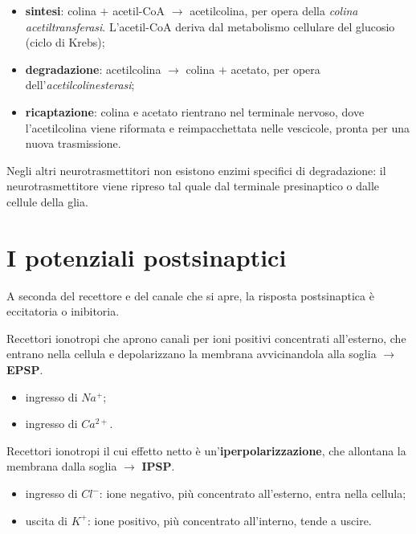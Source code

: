 \begin{itemize}
  \item \textbf{sintesi}: colina $+$ acetil-CoA $\rightarrow$ acetilcolina, per opera della
    \textit{colina acetiltransferasi}. L'acetil-CoA deriva dal metabolismo cellulare del glucosio
    (ciclo di Krebs);
  \item \textbf{degradazione}: acetilcolina $\rightarrow$ colina $+$ acetato, per opera
    dell'\textit{acetilcolinesterasi};
  \item \textbf{ricaptazione}: colina e acetato rientrano nel terminale nervoso, dove l'acetilcolina
    viene riformata e reimpacchettata nelle vescicole, pronta per una nuova trasmissione.
\end{itemize}

Negli altri neurotrasmettitori non esistono enzimi specifici di degradazione: il neurotrasmettitore
viene ripreso tal quale dal terminale presinaptico o dalle cellule della glia.

\section{I potenziali postsinaptici}

A seconda del recettore e del canale che si apre, la risposta postsinaptica è eccitatoria o
inibitoria.

Recettori ionotropi che aprono canali per ioni positivi concentrati all'esterno, che entrano nella
cellula e depolarizzano la membrana avvicinandola alla soglia $\rightarrow$ \textbf{EPSP}.
\begin{itemize}
  \item ingresso di \textbf{$Na^+$};
  \item ingresso di \textbf{$Ca^{2+}$}.
\end{itemize}

Recettori ionotropi il cui effetto netto è un'\textbf{iperpolarizzazione}, che allontana la
membrana dalla soglia $\rightarrow$ \textbf{IPSP}.
\begin{itemize}
  \item ingresso di \textbf{$Cl^-$}: ione negativo, più concentrato all'esterno, entra nella
    cellula;
  \item uscita di \textbf{$K^+$}: ione positivo, più concentrato all'interno, tende a uscire.
\end{itemize}

